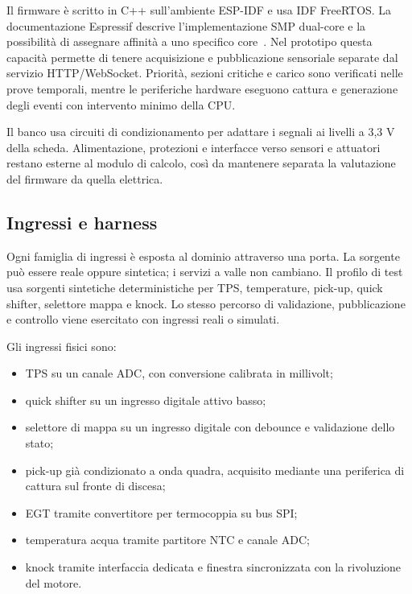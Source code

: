 \documentclass{article}
\begin{document}
Il firmware è scritto in C++ sull'ambiente ESP-IDF e usa IDF FreeRTOS. La
documentazione Espressif descrive l'implementazione SMP dual-core e la possibilità
di assegnare affinità a uno specifico core~\cite{espidf_freertos}. Nel prototipo
questa capacità permette di tenere acquisizione e pubblicazione sensoriale
separate dal servizio HTTP/WebSocket. Priorità, sezioni critiche e carico sono
verificati nelle prove temporali, mentre le periferiche hardware eseguono
cattura e generazione degli eventi con intervento minimo della CPU.

Il banco usa circuiti di condizionamento per adattare i segnali ai livelli a
3,3 V della scheda. Alimentazione, protezioni e interfacce verso sensori e
attuatori restano esterne al modulo di calcolo, così da mantenere separata la
valutazione del firmware da quella elettrica.

\subsection{Ingressi e harness}

Ogni famiglia di ingressi è esposta al dominio attraverso una porta. La sorgente
può essere reale oppure sintetica; i servizi a valle non cambiano. Il profilo
di test usa sorgenti sintetiche deterministiche per TPS, temperature, pick-up,
quick shifter, selettore mappa e knock. Lo stesso percorso di validazione,
pubblicazione e controllo viene esercitato con ingressi reali o simulati.

Gli ingressi fisici sono:

\begin{itemize}
    \item TPS su un canale ADC, con conversione calibrata in millivolt;
    \item quick shifter su un ingresso digitale attivo basso;
    \item selettore di mappa su un ingresso digitale con debounce e validazione
          dello stato;
    \item pick-up già condizionato a onda quadra, acquisito mediante una
          periferica di cattura sul fronte di discesa;
    \item EGT tramite convertitore per termocoppia su bus SPI;
    \item temperatura acqua tramite partitore NTC e canale ADC;
    \item knock tramite interfaccia dedicata e finestra sincronizzata con la
          rivoluzione del motore.
\end{itemize}
\end{document}
